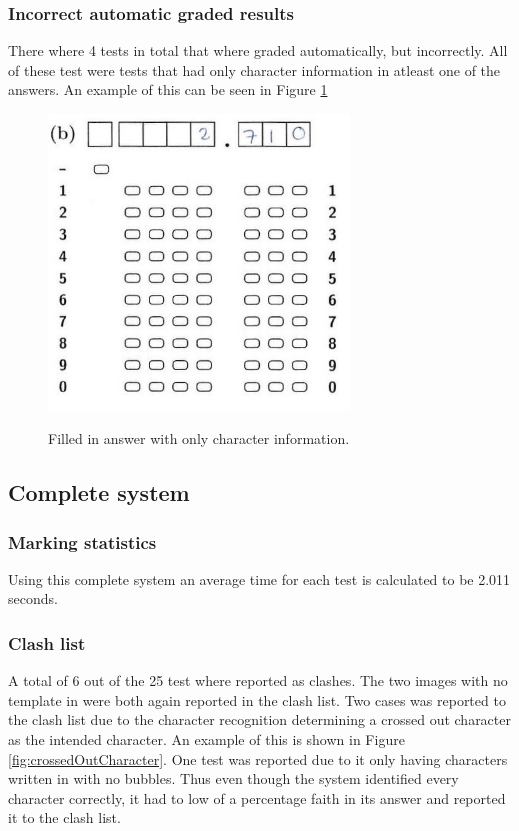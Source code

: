\subsubsection{Incorrect automatic graded results}

There where 4 tests in total that where graded automatically, but incorrectly. All of these test were tests that had only character information in atleast one of the answers. An example of this can be seen in Figure \ref{fig:OnlyCharacters}

\begin{figure}
  \centering
  \includegraphics[width=8cm]{OnlyCharacters}\\
  \caption{Filled in answer with only character information.}
  \label{fig:OnlyCharacters}
\end{figure}

\subsection{Complete system}

\subsubsection{Marking statistics}

Using this complete system an average time for each test is calculated to be 2.011 seconds. 

\subsubsection{Clash list}

A total of 6 out of the 25 test where reported as clashes. The two images with no template in were both again reported in the clash list. Two cases was reported to the clash list due to the character recognition determining a crossed out character as the intended character. An example of this is shown in Figure \ref{fig:crossedOutCharacter}. One test was reported due to it only having characters written in with no bubbles. Thus even though the system identified every character correctly, it had to low of a percentage faith in its answer and reported it to the clash list. 

